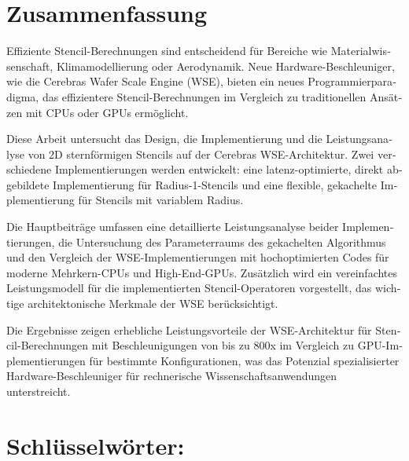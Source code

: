 \begin{otherlanguage}{ngerman}
\section*{Zusammenfassung}
Effiziente Stencil-Berechnungen sind entscheidend für Bereiche wie Materialwissenschaft, Klimamodellierung oder Aerodynamik. Neue Hardware-Beschleuniger, wie die Cerebras Wafer Scale Engine (WSE), bieten ein neues Programmierparadigma, das effizientere Stencil-Berechnungen im Vergleich zu traditionellen Ansätzen mit CPUs oder GPUs ermöglicht.

Diese Arbeit untersucht das Design, die Implementierung und die Leistungsanalyse von 2D sternförmigen Stencils auf der Cerebras WSE-Architektur. Zwei verschiedene Implementierungen werden entwickelt: eine latenz-optimierte, direkt abgebildete Implementierung für Radius-1-Stencils und eine flexible, gekachelte Implementierung für Stencils mit variablem Radius.

Die Hauptbeiträge umfassen eine detaillierte Leistungsanalyse beider Implementierungen, die Untersuchung des Parameterraums des gekachelten Algorithmus und den Vergleich der WSE-Implementierungen mit hochoptimierten Codes für moderne Mehrkern-CPUs und High-End-GPUs. Zusätzlich wird ein vereinfachtes Leistungsmodell für die implementierten Stencil-Operatoren vorgestellt, das wichtige architektonische Merkmale der WSE berücksichtigt.

Die Ergebnisse zeigen erhebliche Leistungsvorteile der WSE-Architektur für Stencil-Berechnungen mit Beschleunigungen von bis zu 800x im Vergleich zu GPU-Implementierungen für bestimmte Konfigurationen, was das Potenzial spezialisierter Hardware-Beschleuniger für rechnerische Wissenschaftsanwendungen unterstreicht.

\section*{Schlüsselwörter:} \itshape \germankeywords
\end{otherlanguage}

